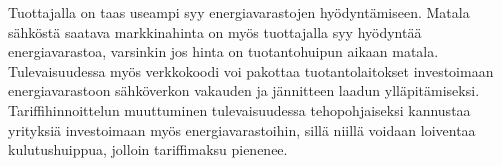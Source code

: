   Tuottajalla on taas useampi syy energiavarastojen hyödyntämiseen. Matala sähköstä saatava markkinahinta on myös tuottajalla syy hyödyntää energiavarastoa, varsinkin jos hinta on tuotantohuipun aikaan matala. Tulevaisuudessa myös verkkokoodi voi pakottaa tuotantolaitokset investoimaan energiavarastoon sähköverkon vakauden ja jännitteen laadun ylläpitämiseksi. Tariffihinnoittelun muuttuminen tulevaisuudessa tehopohjaiseksi kannustaa yrityksiä investoimaan myös energiavarastoihin, sillä niillä voidaan loiventaa kulutushuippua, jolloin tariffimaksu pienenee.
